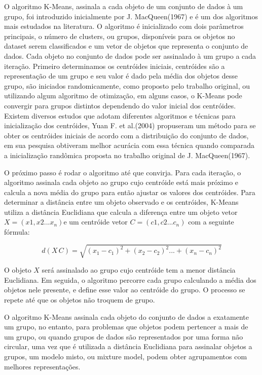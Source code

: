 \documentclass[12pt,a4paper]{article}
\begin{document}
  O algoritmo K-Means, assinala a cada objeto de um conjunto de dados à um grupo, foi introduzido inicialmente por J. MacQueen(1967) e é um dos algoritmos mais estudados na literatura. O algoritmo é inicializado com dois parâmetros principais, o número de clusters, ou grupos, disponíveis para os objetos no dataset serem classificados e um vetor de objetos que representa o conjunto de dados. Cada objeto no conjunto de dados pode ser assinalado à um grupo a cada iteração. Primeiro determinamos os centróides iniciais, centróides são a representação de um grupo e seu valor é dado pela média dos objetos desse grupo, são iniciados randomicamente, como proposto  pelo trabalho original, ou utilizando algum algoritmo de otimização, em alguns casos, o K-Means pode convergir para grupos distintos dependendo do valor inicial dos centróides. Existem diversos estudos que adotam diferentes algoritmos e técnicas para inicialização dos centróides, Yuan F. et al.(2004) propuseram um método  para se obter os centróides iniciais de acordo com a distribuição do conjunto de dados, em sua pesquisa obtiveram melhor acurácia com essa técnica quando comparada a inicialização randômica proposta no trabalho original de J. MacQueen(1967).
  
  O próximo passo é rodar o algoritmo até que convirja. Para cada iteração, o algoritmo assinala cada objeto ao grupo cujo centróide está mais próximo e calcula a nova média do grupo para então ajustar os valores dos centróides. Para determinar a distância entre um objeto observado e os centróides, K-Means utiliza a distância Euclidiana que calcula a diferença entre um objeto vetor \(X=(x1, x2... x_n)\)e um centróide vetor \(C=(c1, c2... c_n)\) com a seguinte fórmula: 
  
  \begin{equation}
  d(X\,C) = \sqrt{(x_1 - c_1)^2 + (x_2 - c_2)^2 ... + (x_n - c_n)^2}
  \end{equation}
  
  O objeto $X$ será assinalado ao grupo cujo centróide tem a menor distância Euclidiana. Em seguida, o algoritmo percorre cada grupo calculando a média dos objetos nele presente, e define esse valor ao centróide do grupo. O processo se repete até que os objetos não troquem de grupo.
  
  O algoritmo K-Means assinala cada objeto do conjunto de dados a exatamente um grupo, no entanto, para problemas que objetos podem pertencer a mais de um grupo, ou quando grupos de dados são representados por uma forma não circular, uma vez que é  utilizada a distância Euclidiana para assinalar objetos a grupos, um modelo misto, ou mixture model, podem obter agrupamentos com melhores representações.
  
\end{document}
